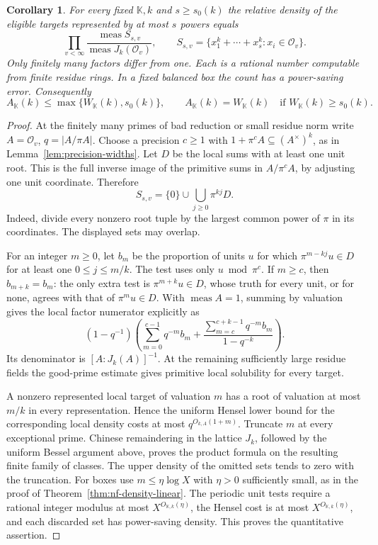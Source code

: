 \documentclass[11pt,letterpaper]{article}
\newtheorem{corollary}[corollary]{Corollary}
\theoremstyle{definition}
\numberwithin{equation}{section}
\begin{document}
\begin{corollary}\label{cor:nf-ordinary-density}
For every fixed $\mathbb K,k$ and $s\ge s_0(k)$ the relative density
of the eligible targets represented by at most $s$ powers equals
\[
        \prod_{v<\infty}
        \frac{\operatorname{meas}S_{s,v}}{\operatorname{meas}J_k(\mathcal O_v)},
 \qquad
 S_{s,v}=\{x_1^k+\cdots+x_s^k:x_i\in\mathcal O_v\}.
\]
Only finitely many factors differ from one. Each is a rational number
computable from finite residue rings. In a fixed balanced box the
count has a power-saving error. Consequently
\[
 A_{\mathbb K}(k)\le\max\{W_{\mathbb K}(k),s_0(k)\},\qquad
 A_{\mathbb K}(k)=W_{\mathbb K}(k)
                    \quad\text{if }W_{\mathbb K}(k)\ge s_0(k).
\]
\end{corollary}
\begin{proof}
At the finitely many primes of bad reduction or small residue norm
write $A=\mathcal O_v$, $q=|A/\pi A|$. Choose a precision
$c\ge1$ with $1+\pi^cA\subseteq(A^\times)^k$, as in
Lemma~\ref{lem:precision-widths}. Let $D$ be the local sums with at
least one unit root. This is the full inverse image of the primitive
sums in $A/\pi^c A$, by adjusting one unit coordinate. Therefore
\[
       S_{s,v}=\{0\}\cup\bigcup_{j\ge0}\pi^{kj}D .
\]
Indeed, divide every nonzero root tuple by the largest common power
of $\pi$ in its coordinates. The displayed sets may overlap.

For an integer $m\ge0$, let $b_m$ be the proportion of units $u$
for which $\pi^{m-kj}u\in D$ for at least one $0\le j\le m/k$.
The test uses only $u\bmod\pi^c$. If $m\ge c$, then
$b_{m+k}=b_m$: the only extra test is $\pi^{m+k}u\in D$,
whose truth for every unit, or for none, agrees with that of
$\pi^m u\in D$. With $\operatorname{meas} A=1$, summing by
valuation gives the local factor numerator explicitly as
\[
 (1-q^{-1})\left(\sum_{m=0}^{c-1} q^{-m} b_m+
              \frac{\sum_{m=c}^{c+k-1}q^{-m} b_m}{1-q^{-k}}\right).
\]
Its denominator is $[A:J_k(A)]^{-1}$. At the remaining sufficiently
large residue fields the good-prime estimate gives primitive local
solubility for every target.

A nonzero represented local target of valuation $m$ has a root
of valuation at most $m/k$ in every representation. Hence the
uniform Hensel lower bound for the corresponding local density
costs at most $q^{O_{k,A}(1+m)}$. Truncate $m$ at every exceptional
prime. Chinese remaindering in the lattice $J_k$, followed by the
uniform Bessel argument above, proves the product formula on
the resulting finite family of classes. The upper density of the
omitted sets tends to zero with the truncation. For boxes use
$m\le\eta\log X$ with $\eta>0$ sufficiently small, as in the
proof of Theorem~\ref{thm:nf-density-linear}. The periodic unit
tests require a rational integer modulus at most
$X^{O_{\mathbb K,k}(\eta)}$, the Hensel cost is at most
$X^{O_{\mathbb K,k}(\eta)}$, and each discarded set has
power-saving density. This proves the quantitative assertion.


\end{proof}
\end{document}
